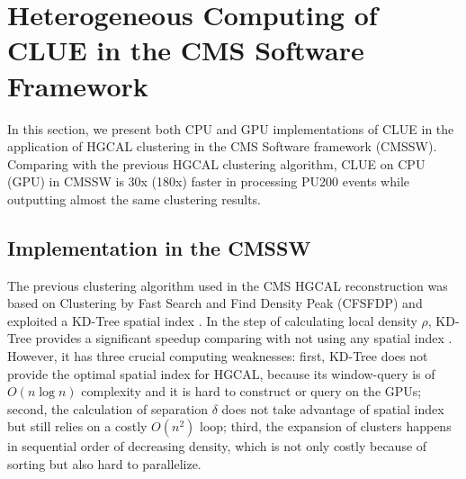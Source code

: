 \section{Heterogeneous Computing of CLUE in the CMS Software Framework}
\label{sec:cmsswClue}



In this section, we present both CPU and GPU implementations of CLUE in the application of HGCAL clustering in the CMS Software framework (CMSSW). Comparing with the previous HGCAL clustering algorithm, CLUE on CPU (GPU) in CMSSW is 30x (180x) faster in processing PU200 events while outputting almost the same clustering results.


\subsection{Implementation in the CMSSW}



The previous clustering algorithm \cite{Chen:2017btc} used in the CMS HGCAL reconstruction was based on Clustering by Fast Search and Find Density Peak (CFSFDP) \cite{rodriguez2014clustering} and exploited a KD-Tree spatial index \cite{Bentley:1975:MBS:361002.361007}. In the step of calculating local density $\rho$, KD-Tree provides a significant speedup comparing with not using any spatial index \cite{Chen:2017btc}. However, it has three crucial computing weaknesses: first, KD-Tree does not provide the optimal spatial index for HGCAL, because its window-query is of $O(n\log n)$ complexity and it is hard to construct or query on the GPUs; second, the calculation of separation $\delta$ does not take advantage of spatial index but still relies on a costly $O(n^2)$ loop; third, the expansion of clusters happens in sequential order of decreasing density, which is not only costly because of sorting but also hard to parallelize.


